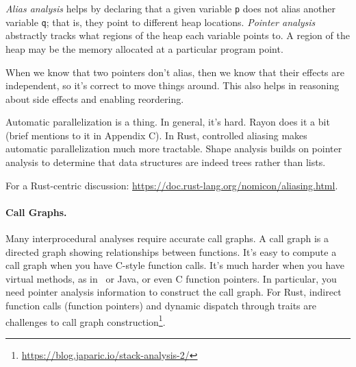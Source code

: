 \emph{Alias analysis} helps by declaring that a
given variable {\tt p} does not alias another variable {\tt q}; that
is, they point to different heap locations. \emph{Pointer analysis}
abstractly tracks what regions of the heap each variable points to.
A region of the heap may be the memory allocated at a particular
program point.

When we know that two pointers don't alias, then we know that their
effects are independent, so it's correct to move things around.
This also helps in reasoning about side effects and enabling reordering.

Automatic parallelization is a thing. In general, it's hard. Rayon does it a bit
(brief mentions to it in Appendix C).
In Rust, controlled aliasing makes automatic parallelization much more tractable.
Shape analysis
builds on pointer analysis to determine that data structures are indeed
trees rather than lists.

For a Rust-centric discussion: \url{https://doc.rust-lang.org/nomicon/aliasing.html}.

\paragraph{Call Graphs.} Many interprocedural analyses require accurate
call graphs. A call graph is a directed graph showing relationships between
functions. It's easy to compute a call graph when you have C-style
function calls. It's much harder when you have virtual methods, as in
\CPP~or Java, or even C function pointers. In particular, you need pointer
analysis information to construct the call graph. For Rust, indirect function
calls (function pointers) and dynamic dispatch through traits are challenges
to call graph construction\footnote{\url{https://blog.japaric.io/stack-analysis-2/}}.

